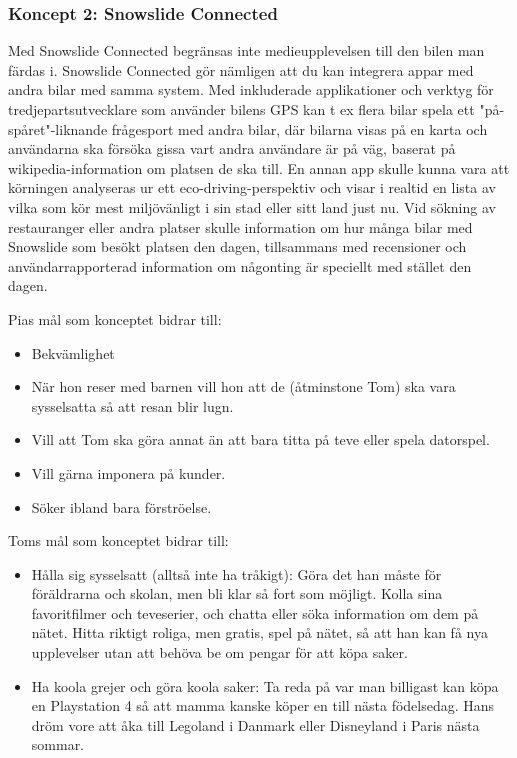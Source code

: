 \documentclass[a4paper,12pt,titlepage]{article}
\begin{document}
\newpage
\subsubsection*{Koncept 2: Snowslide Connected}

Med Snowslide Connected begränsas inte medieupplevelsen till den bilen man
färdas i. Snowslide Connected gör nämligen att du kan integrera appar med andra
bilar med samma system. Med inkluderade applikationer och verktyg för
tredjepartsutvecklare som använder bilens GPS kan t ex flera bilar spela 
ett "på-spåret"-liknande
frågesport med andra bilar, där bilarna visas på en karta och användarna ska
försöka gissa vart andra användare är på väg, baserat på wikipedia-information
om platsen de ska till. En annan app skulle kunna vara att körningen analyseras
ur ett eco-driving-perspektiv och visar i realtid en lista av vilka som kör
mest miljövänligt i sin stad eller sitt land just nu. Vid sökning av
restauranger eller andra platser skulle information om hur många bilar med
Snowslide som besökt platsen den dagen, tillsammans med recensioner och
användarrapporterad information om någonting är speciellt med stället den
dagen.

Pias mål som konceptet bidrar till:
\begin{itemize}
    \item Bekvämlighet
    \item När hon reser med barnen vill
        hon att de (åtminstone Tom) ska vara
        sysselsatta så att resan blir lugn.
    \item Vill att Tom ska göra annat än att
        bara titta på teve eller spela datorspel.
    \item Vill gärna imponera på kunder.
    \item Söker ibland bara förströelse.
\end{itemize}

Toms mål som konceptet bidrar till:
\begin{itemize}
    \item Hålla sig sysselsatt (alltså inte ha
        tråkigt): Göra det han måste för
        föräldrarna och skolan, men bli klar så
        fort som möjligt. Kolla sina
        favoritfilmer och teveserier, och chatta
        eller söka information om dem på
        nätet. Hitta riktigt roliga, men gratis,
        spel på nätet, så att han kan få nya
        upplevelser utan att behöva be om
        pengar för att köpa saker. 
    \item Ha koola grejer och göra koola
        saker: Ta reda på var man billigast kan
        köpa en Playstation 4 så att mamma
        kanske köper en till nästa födelsedag.
        Hans dröm vore att åka till Legoland i
        Danmark eller Disneyland i Paris
        nästa sommar.
\end{itemize}
\end{document}
